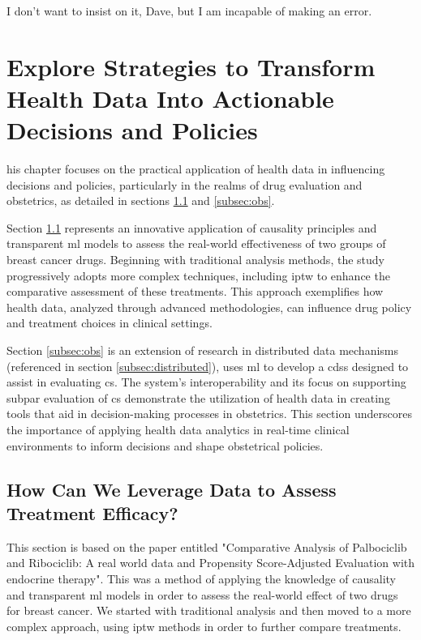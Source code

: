 
\begin{savequote}[85mm]
    I don’t want to insist on it, Dave, but I am incapable of making an error.
    \end{savequote}
    
\chapter{Explore Strategies to Transform Health Data Into Actionable Decisions and Policies}\label{chap:goal3}

his chapter focuses on the practical application of health data in influencing decisions and policies, particularly in the realms of drug evaluation and obstetrics, as detailed in sections \ref{subsec:ipop} and \ref{subsec:obs}.

Section \ref{subsec:ipop} represents an innovative application of causality principles and transparent \ac{ml} models to assess the real-world effectiveness of two groups of breast cancer drugs. Beginning with traditional analysis methods, the study progressively adopts more complex techniques, including \ac{iptw} to enhance the comparative assessment of these treatments. This approach exemplifies how health data, analyzed through advanced methodologies, can influence drug policy and treatment choices in clinical settings.

Section \ref{subsec:obs} is an extension of research in distributed data mechanisms (referenced in section \ref{subsec:distributed}), uses \ac{ml} to develop a \ac{cdss} designed to assist in evaluating \ac{cs}. The system's interoperability and its focus on supporting subpar evaluation of \ac{cs} demonstrate the utilization of health data in creating tools that aid in decision-making processes in obstetrics. This section underscores the importance of applying health data analytics in real-time clinical environments to inform decisions and shape obstetrical policies.



\section{How Can We Leverage Data to Assess Treatment Efficacy?}\label{subsec:ipop}
This section is based on the paper entitled "Comparative Analysis of Palbociclib and Ribociclib: A real world data and Propensity Score-Adjusted Evaluation with endocrine therapy". This was a method of applying the knowledge of causality and transparent \ac{ml} models in order to assess the real-world effect of two drugs for breast cancer. We started with traditional analysis and then moved to a more complex approach, using \ac{iptw} methods in order to further compare treatments.
    
